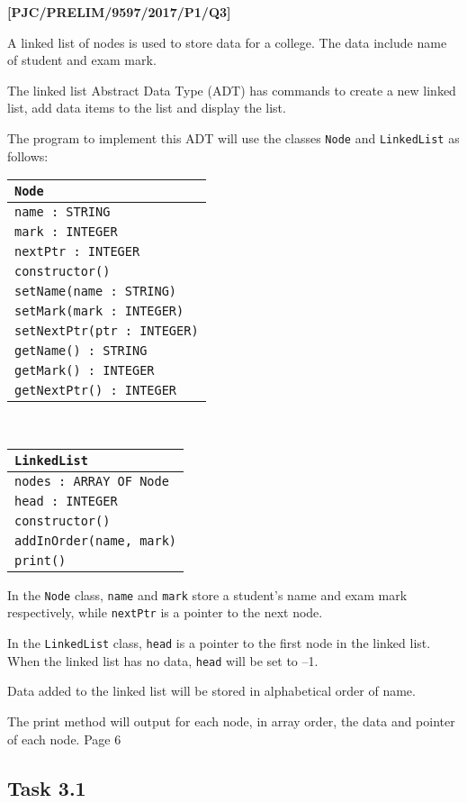 \item \textbf{{[}PJC/PRELIM/9597/2017/P1/Q3{]} }

A linked list of nodes is used to store data for a college. The data
include name of student and exam mark. 

The linked list Abstract Data Type (ADT) has commands to create a
new linked list, add data items to the list and display the list. 

The program to implement this ADT will use the classes \texttt{Node}
and \texttt{LinkedList} as follows: 
\begin{center}
\begin{tabular}{|l|}
\hline 
\texttt{\hspace{0.25\columnwidth}Node}\tabularnewline
\hline 
\texttt{name : STRING}\tabularnewline
\texttt{mark : INTEGER}\tabularnewline
\texttt{nextPtr : INTEGER}\tabularnewline
\hline 
\texttt{constructor()}\tabularnewline
\texttt{setName(name : STRING)}\tabularnewline
\texttt{setMark(mark : INTEGER) }\tabularnewline
\texttt{setNextPtr(ptr : INTEGER)}\tabularnewline
\texttt{getName() : STRING}\tabularnewline
\texttt{getMark() : INTEGER}\tabularnewline
\texttt{getNextPtr() : INTEGER}\tabularnewline
\hline 
\end{tabular}~~~~~~%
\begin{tabular}{|l|}
\hline 
\texttt{\hspace{0.25\columnwidth}LinkedList}\tabularnewline
\hline 
\texttt{nodes : ARRAY OF Node}\tabularnewline
\texttt{head : INTEGER}\tabularnewline
\hline 
\texttt{constructor()}\tabularnewline
\texttt{addInOrder(name, mark)}\tabularnewline
\texttt{print() }\tabularnewline
\hline 
\end{tabular}
\par\end{center}

In the \texttt{Node} class, \texttt{name} and \texttt{mark} store
a student\textquoteright s name and exam mark respectively, while
\texttt{nextPtr} is a pointer to the next node. 

In the \texttt{LinkedList} class, \texttt{head} is a pointer to the
first node in the linked list. When the linked list has no data, \texttt{head}
will be set to --1.

Data added to the linked list will be stored in alphabetical order
of name. 

The print method will output for each node, in array order, the data
and pointer of each node. Page 6 

\subsection*{Task 3.1}

